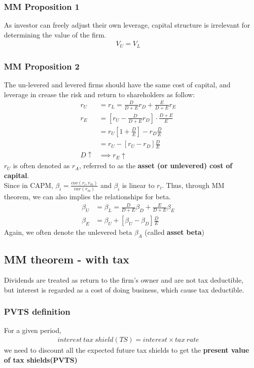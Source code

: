 \documentclass{article}
\theoremstyle{definition}
\theoremstyle{thrm}
\theoremstyle{lma}
\theoremstyle{ppst}
\theoremstyle{crlr}
\begin{document}
\subsubsection{MM Proposition 1}
As investor can freely adjust their own leverage, capital structure is irrelevant for determining the value of the firm.
\begin{align*}
	V_U = V_L
\end{align*}

\subsubsection{MM Proposition 2}
The un-levered and levered firms should have the same cost of capital, and leverage in crease the risk and return to shareholders as follow:
\begin{align*}
	r_U &= r_L = \frac{D}{D+E}r_D+\frac{E}{D+E}r_E\\
	r_E &= [r_U - \frac{D}{D+E}r_D]\cdot \frac{D+E}{E}\\
	&=r_U[1+\frac{D}{E}] - r_D\frac{D}{E}\\
	&= r_U-[r_U-r_D]\frac{D}{E}\\
	D \uparrow &\implies r_E \uparrow
\end{align*}
$r_U$ is often denoted as $r_A$, referred to as the \textbf{asset (or unlevered) cost of capital}.\\
Since in CAPM, $\beta_i= \frac{cov(r_i, r_m)}{var(r_m)}$ and $\beta_i$ is linear to $r_i$. Thus, through MM theorem, we can also implies the relationships for beta.
\begin{align*}
	\beta_U &= \beta_L = \frac{D}{D+E}\beta_D+\frac{E}{D+E}\beta_E\\
	\beta_E &= \beta_U + [\beta_U-\beta_D]\frac{D}{E}
\end{align*}
Again, we often denote the unlevered beta $\beta_A$ (called \textbf{asset beta})

\subsection{MM theorem - with tax}
Dividends are treated as return to the firm's owner and are not tax deductible, but interest is regarded as a cost of doing business, which cause tax deductible. 

\subsubsection{PVTS definition}
For a given period, 
\begin{align*}
	interest \ tax\ shield(TS) = interest \times tax\ rate
\end{align*}
we need to discount all the expected future tax shields to get the \textbf{present value of tax shields(PVTS)}
\end{document}
